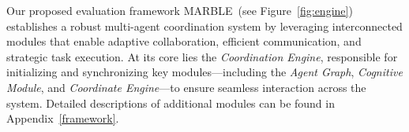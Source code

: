

Our proposed evaluation framework MARBLE~(see Figure~\ref{fig:engine}) establishes a robust multi-agent coordination system by leveraging interconnected modules that enable adaptive collaboration, efficient communication, and strategic task execution. At its core lies the \textit{Coordination Engine}, responsible for initializing and synchronizing key modules—including the \textit{Agent Graph}, \textit{Cognitive Module}, and \textit{Coordinate Engine}—to ensure seamless interaction across the system. Detailed descriptions of additional modules can be found in Appendix~\ref{framework}. 

